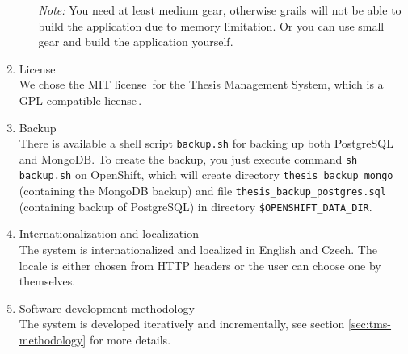 \begin{enumerate}
\begin{enumerate}
        \item[\emph{Note:}] You need at least medium gear, otherwise grails will not be able to build the application due to memory limitation. Or you can use small gear and build the application yourself.
    \end{enumerate}

    \item License\\
    We chose the MIT license\,\cite{mit-license} for the Thesis Management System, which is a GPL compatible license\,\cite{gpl-compatible-licenses}.

    \item Backup\\
    There is available a shell script \texttt{backup.sh} for backing up both PostgreSQL and MongoDB. To create the backup, you just execute command \texttt{sh backup.sh} on OpenShift, which will create directory \texttt{thesis\_backup\_mongo} (containing the MongoDB backup) and file \texttt{thesis\_backup\_postgres.sql} (containing backup of PostgreSQL) in directory \texttt{\$OPENSHIFT\_DATA\_DIR}.

    \item Internationalization and localization\\
    The system is internationalized and localized in English and Czech. The locale is either chosen from HTTP headers or the user can choose one by themselves.

    \item Software development methodology\\
    The system is developed iteratively and incrementally, see section \ref{sec:tms-methodology} for more details.

\end{enumerate}